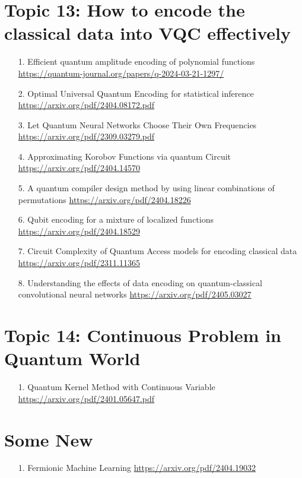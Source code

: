 \documentclass[12pt, oneside]{article}   	%
\begin{document}
\section{Topic 13: How to encode the classical data into VQC effectively}
\begin{itemize}
\item[1. ] Efficient quantum amplitude encoding of polynomial functions \url{https://quantum-journal.org/papers/q-2024-03-21-1297/}
\item[2.] Optimal Universal Quantum Encoding for statistical inference \url{https://arxiv.org/pdf/2404.08172.pdf}
\item[3.] Let Quantum  Neural Networks Choose Their Own Frequencies \url{https://arxiv.org/pdf/2309.03279.pdf}
\item [4. ] Approximating Korobov Functions via quantum Circuit \url{https://arxiv.org/pdf/2404.14570}
\item [5. ] A quantum compiler design method by using linear combinations of permutations \url{https://arxiv.org/pdf/2404.18226}
\item [6. ] Qubit encoding for a mixture of localized functions \url{https://arxiv.org/pdf/2404.18529}
\item [7.] Circuit Complexity of Quantum Access models for encoding classical data \url{https://arxiv.org/pdf/2311.11365}
\item [8. ] Understanding the effects of data encoding on quantum-classical convolutional neural networks \url{https://arxiv.org/pdf/2405.03027}
\end{itemize}
\section{Topic 14: Continuous Problem in Quantum World}
\begin{itemize}
\item[1. ] Quantum Kernel Method with Continuous Variable \url{https://arxiv.org/pdf/2401.05647.pdf}
\end{itemize}
\section*{Some New}
\begin{itemize}
	\item [1. ] Fermionic Machine Learning \url{https://arxiv.org/pdf/2404.19032}
\end{itemize}
\end{document}
